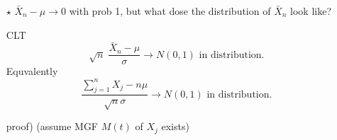 \documentclass{oblivoir}
\begin{document}
\begin{itemize}
\begin{enumerate}
\begin{myframe}{L`Hopital's Theorem}
함수 $f(x), g(x)$가 미분가능하고 $f(a) = 0, g(a) = 0$이고, $\displaystyle \lim_{x \rightarrow a} g(x) \ne 0$ 일때,
$$
\lim_{x \rightarrow a} \frac{f(x)}{g(x)} = \lim_{x \rightarrow a} \frac{f^{\prime} (x)}{g^{\prime}(x)}
$$
\end{myframe}
\begin{myframe}{Law of Large Numbers}
\begin{itemize}
\item[(Strong)]
$$
\bar{X}_n \rightarrow \mu \mbox{ as }  n \rightarrow \infty \mbox{ with prob } 1.
$$
\item[(Weak)] 
$$
\mbox{For any } C > 0, \; P(|\bar{X}_n - \mu| > c) \rightarrow 0 \mbox{ as } n \rightarrow \infty
$$
\end{itemize}
\end{myframe}

\item[$\star$] 
$\bar{X}_n - \mu \rightarrow 0$ with prob 1, but what dose the distribution of $\bar{X}_n$ look like?

\begin{myframe}{CLT}
$$
\sqrt{n}\; \frac{\bar{X}_n - \mu}{\sigma} \rightarrow N(0,1) \mbox{ in distribution.}
$$
Equvalently
$$
\frac{\sum_{j=1}^n X_j - n\mu}{\sqrt{n} \sigma} \rightarrow N(0,1) \mbox{ in distribution.}
$$
\end{myframe}

proof) (assume MGF $M(t)$ of $X_j$ exists)


\end{enumerate}
\end{itemize}
\end{document}
